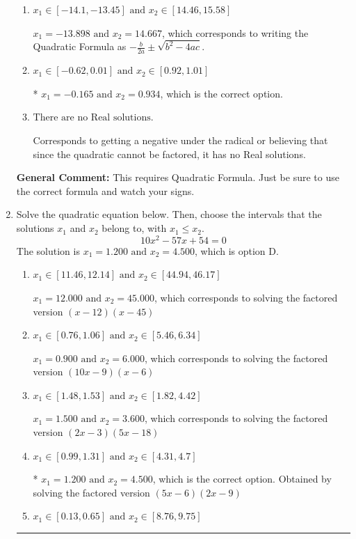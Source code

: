 \documentclass{extbook}[14pt]
\newcommand{\litem}[1]{\item #1

\rule{\textwidth}{0.4pt}}
\begin{document}
\begin{enumerate}
{\begin{enumerate}[label=\Alph*.]
 $x_1 = -0.934 \text{ and } x_2 = 0.165$, which corresponds to writing the Quadratic Formula as $\frac{b \pm \sqrt{b^2 - 4ac}}{2a}$
\item \( x_1 \in [-14.1, -13.45] \text{ and } x_2 \in [14.46, 15.58] \)

 $x_1 = -13.898 \text{ and } x_2 = 14.667$, which corresponds to writing the Quadratic Formula as $-\frac{b}{2a} \pm \sqrt{b^2 - 4ac}$.
\item \( x_1 \in [-0.62, 0.01] \text{ and } x_2 \in [0.92, 1.01] \)

* $x_1 = -0.165 \text{ and } x_2 = 0.934$, which is the correct option.
\item \( \text{There are no Real solutions.} \)

Corresponds to getting a negative under the radical or believing that since the quadratic cannot be factored, it has no Real solutions.
\end{enumerate}

\textbf{General Comment:} This requires Quadratic Formula. Just be sure to use the correct formula and watch your signs.
}
\litem{
Solve the quadratic equation below. Then, choose the intervals that the solutions $x_1$ and $x_2$ belong to, with $x_1 \leq x_2$.
\[ 10x^{2} -57 x + 54 = 0 \]The solution is \( x_1 = 1.200 \text{ and } x_2 = 4.500 \), which is option D.\begin{enumerate}[label=\Alph*.]
\item \( x_1 \in [11.46, 12.14] \text{ and } x_2 \in [44.94, 46.17] \)

$x_1 = 12.000 \text{ and } x_2 = 45.000$, which corresponds to solving the factored version $(x -12)(x -45)$
\item \( x_1 \in [0.76, 1.06] \text{ and } x_2 \in [5.46, 6.34] \)

$x_1 = 0.900 \text{ and } x_2 = 6.000$, which corresponds to solving the factored version $(10x -9)(x -6)$
\item \( x_1 \in [1.48, 1.53] \text{ and } x_2 \in [1.82, 4.42] \)

$x_1 = 1.500 \text{ and } x_2 = 3.600$, which corresponds to solving the factored version $(2x -3)(5x -18)$
\item \( x_1 \in [0.99, 1.31] \text{ and } x_2 \in [4.31, 4.7] \)

* $x_1 = 1.200 \text{ and } x_2 = 4.500$, which is the correct option. Obtained by solving the factored version $(5x -6)(2x -9)$
\item \( x_1 \in [0.13, 0.65] \text{ and } x_2 \in [8.76, 9.75] \)


\end{enumerate}}
\end{enumerate}
\end{document}
